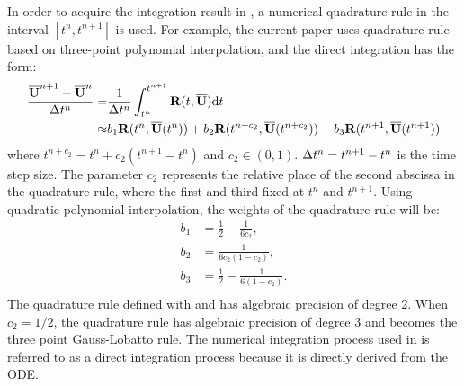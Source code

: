 In order to acquire the integration result in
, a numerical quadrature rule in the interval
$[t^n, t^{n+1}]$ is used. For example, the current paper
uses quadrature rule based on three-point polynomial
interpolation, and the direct integration has
the form:
\begin{equation}
    \label{eq:Quad3}
    \begin{aligned}
        \frac{\overline{\mathbf{U}}^{n+1} - \overline{\mathbf{U}}^{n}}{{\Delta} t^n} = & \frac{1}{{\Delta} t^n}
        \int_{t^n}^{t^{n+1}}{
        \mathbf{R}(t, \overline{\mathbf{U}}) \dd t
        }                                                           \\ \approx &
        b_1\mathbf{R}(t^n, \overline{\mathbf{U}}(t^n))
        +
        b_2\mathbf{R}(t^{n+c_2}, \overline{\mathbf{U}}(t^{n+c_2}))
        +
        b_3\mathbf{R}(t^{n+1}, \overline{\mathbf{U}}(t^{n+1}))
    \end{aligned}
\end{equation}
where $t^{n+c_2} = t^{n} + c_2 (t^{n+1} - t^n)$ and $c_2\in(0,1)$.
${\Delta} t^n=t^{n+1} - t^n$ is
the time step size.
The parameter $c_2$ represents the relative place of the second abscissa
in the quadrature rule, where the first and third fixed at $t^{n}$ and $t^{n + 1}$.
Using quadratic polynomial interpolation,
the weights of the quadrature rule will be:
\begin{equation}
    \begin{aligned}
        b_1 & = \frac{1}{2} - \frac{1}{6{c_2}},     \\
        b_2 & = \frac{1}{6{c_2}(1-{c_2})},          \\
        b_3 & = \frac{1}{2} - \frac{1}{6(1-{c_2})}. \\
    \end{aligned}
    \label{eq:integ0}
\end{equation}
The quadrature rule defined with
 and  has algebraic precision
of degree 2. When $c_2=1/2$, the quadrature rule has algebraic precision of
degree 3 and becomes the three point Gauss-Lobatto rule.
The numerical integration process used in 
is referred to as a direct integration process because it is
directly derived from the ODE.



